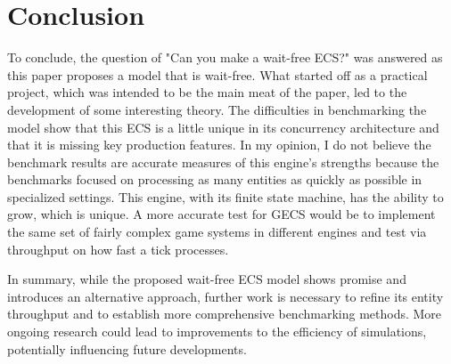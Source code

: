 \section{Conclusion}
To conclude, the question of "Can you make a wait-free ECS?" was answered as this paper proposes a model that is wait-free. What started off as a practical project, which was intended to be the main meat of the paper, led to the development of some interesting theory. The difficulties in benchmarking the model show that this ECS is a little unique in its concurrency architecture and that it is missing key production features. In my opinion, I do not believe the benchmark results are accurate measures of this engine's strengths because the benchmarks focused on processing as many entities as quickly as possible in specialized settings. This engine, with its finite state machine, has the ability to grow, which is unique. A more accurate test for GECS would be to implement the same set of fairly complex game systems in different engines and test via throughput on how fast a tick processes.

In summary, while the proposed wait-free ECS model shows promise and introduces an alternative approach, further work is necessary to refine its entity throughput and to establish more comprehensive benchmarking methods. More ongoing research could lead to improvements to the efficiency of simulations, potentially influencing future developments.
\newpage